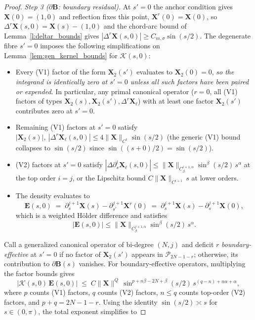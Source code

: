 \documentclass{amsart}
\begin{document}
\begin{proof}
\emph{Step 3 ($\partial\mathbf{B}$: boundary residual).}
At $s' = 0$ the anchor condition gives $\mathbf{X}(0) = (1, 0)$ and reflection fixes this point, $\mathbf{X}^r(0) = \mathbf{X}(0)$, so $\Delta^r\mathbf{X}(s, 0) = \mathbf{X}(s) - (1,0)$ and the chord-arc bound of Lemma~\ref{l:deltar_bounds} gives $|\Delta^r\mathbf{X}(s,0)| \ge C_{m,\sigma} \sin(s/2)$.  The degenerate fibre $s' = 0$ imposes the following simplifications on Lemma~\ref{lem:gen_kernel_bounds} for $\mathcal{K}(s, 0)$:
\begin{itemize}
\item Every (V1) factor of the form $\mathbf{X}_2(s')$ evaluates to $\mathbf{X}_2(0) = 0$, \emph{so the integrand is identically zero at $s' = 0$ unless all such factors have been paired or expended}.  In particular, any primal canonical operator ($r = 0$, all (V1) factors of types $\mathbf{X}_2(s), \mathbf{X}_2(s'), \Delta^r\mathbf{X}_\ell$) with at least one factor $\mathbf{X}_2(s')$ contributes zero at $s' = 0$.
\item Remaining (V1) factors at $s' = 0$ satisfy $|\mathbf{X}_2(s)|,\ |\Delta^r\mathbf{X}_\ell(s, 0)| \le 4\|\mathbf{X}\|_{C^1}\sin(s/2)$ (the generic (V1) bound collapses to $\sin(s/2)$ since $\sin((s+0)/2) = \sin(s/2)$).
\item (V2) factors at $s' = 0$ satisfy $|\Delta\partial_s^i\mathbf{X}_\ell(s, 0)| \le \|\mathbf{X}\|_{C^{i+1,\alpha}_\beta} \sin^\beta(s/2)\, s^\alpha$ at the top order $i = j$, or the Lipschitz bound $C\|\mathbf{X}\|_{C^{i+1}}\,s$ at lower orders.
\item The density evaluates to
\[
\mathbf{E}(s, 0)
\;=\; \partial_s^{j+1}\mathbf{X}(s) - \partial_{s'}^{j+1}\mathbf{X}^r(0)
\;=\; \partial_s^{j+1}\mathbf{X}(s) - \partial_s^{j+1}\mathbf{X}(0),
\]
which is a weighted Hölder difference and satisfies $$|\mathbf{E}(s, 0)| \le \|\mathbf{X}\|_{C^{j+1,\alpha}_\beta} \sin^\beta(s/2)\, s^\alpha.$$
\end{itemize}
Call a generalized canonical operator of bi-degree $(N, j)$ and deficit $r$ \emph{boundary-effective} at $s' = 0$ if no factor of $\mathbf{X}_2(s')$ appears in $\mathcal{P}_{2N-1-r}$; otherwise, its contribution to $\partial\mathbf{B}(s)$ vanishes.  For boundary-effective operators, multiplying the factor bounds gives
\[
|\mathcal{K}(s, 0)\,\mathbf{E}(s, 0)|
 \;\le\; C\|\mathbf{X}\|^{Q}\,
  \sin^{p + n\beta - 2N + \beta}(s/2)\, s^{(q-n) + n\alpha + \alpha},
\]
where $p$ counts (V1) factors, $q$ counts (V2) factors, $n \le q$ counts top-order (V2) factors, and $p + q = 2N - 1 - r$.  Using the identity $\sin(s/2) \asymp s$ for $s \in (0,\pi)$, the total exponent simplifies to

\end{proof}
\end{document}
